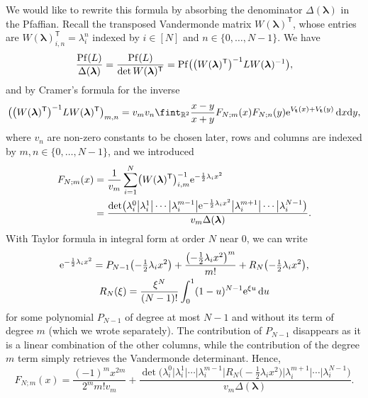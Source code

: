 \documentclass[10pt,a4paper]{amsart}
\numberwithin{equation}{section}
\newcommand{\dd}{\mathrm{d}}
\begin{document}
We would like to rewrite this formula by absorbing the denominator $\Delta(\boldsymbol{\lambda})$ in the Pfaffian. Recall the transposed Vandermonde matrix $W(\boldsymbol{\lambda})^{\mathsf T}$, whose entries are $W(\boldsymbol{\lambda})_{i,n}^{\mathsf T} = \lambda_i^{n}$ indexed by $i \in [N]$ and $n \in \{0,\dots,N - 1\}$. We have
\[
\frac{{\rm Pf}(L)}{\Delta(\boldsymbol{\lambda})} = \frac{{\rm Pf}(L)}{\det W(\boldsymbol{\lambda})^{\mathsf T}} = {\rm Pf}\bigl(\bigl(W(\boldsymbol{\lambda})^{\mathsf T}\bigr)^{-1} LW(\boldsymbol{\lambda})^{-1}\bigr),
\]
and by Cramer's formula for the inverse
\[
\bigl(\bigl(W(\boldsymbol{\lambda})^{\mathsf T}\bigr)^{-1} L W(\boldsymbol{\lambda})^{\mathsf T}\bigr)_{m,n} = v_mv_n\fint_{\mathbb{R}^2} \frac{x - y}{x + y} F_{N;m}(x)F_{N;n}(y) {\rm e}^{V_{\mathbf{t}}(x) + V_{\mathbf{t}}(y)}\,\dd x\dd y,
\]
where $v_n$ are non-zero constants to be chosen later, rows and columns are indexed by $m,n \in \{0,\dots,N - 1\}$, and we introduced
\begin{align*}
F_{N;m}(x) &{}= \frac{1}{v_m}\sum_{i = 1}^{N} \bigl(W(\boldsymbol{\lambda})^{\mathsf T}\bigr)^{-1}_{i,m} {\rm e}^{-\frac{1}{2}\lambda_i x^2} \\
&{}= \frac{\det\bigl(\lambda_i^0 \big| \lambda_i^1  \big| \cdots \big| \lambda_i^{m - 1} \big| {\rm e}^{-\frac{1}{2}\lambda_i x^2} \big| \lambda_i^{m + 1} \big| \cdots \big| \lambda_i^{N - 1}\bigr)}{v_m \Delta(\boldsymbol{\lambda})}.
\end{align*}
With Taylor formula in integral form at order $N$ near $0$, we can write
\begin{gather*}
{\rm e}^{-\frac{1}{2}\lambda_ix^2} = P_{N - 1}\bigl(-\tfrac{1}{2}\lambda_ix^2\bigr) + \frac{\bigl(-\frac{1}{2}\lambda_i x^2\bigr)^m}{m!} + R_{N}\bigl(-\tfrac{1}{2}\lambda_i x^2\bigr), \\
R_N(\xi) = \frac{\xi^{N}}{(N - 1)!} \int_{0}^{1}(1-u)^{N - 1} {\rm e}^{\xi u}\, \dd u
\end{gather*}
for some polynomial $P_{N - 1}$ of degree at most $N - 1$ and without its term of degree $m$ (which we wrote separately). The contribution of $P_{N - 1}$ disappears as it is a linear combination of the other columns, while the contribution of the degree $m$ term simply retrieves the Vandermonde determinant. Hence,
\[
F_{N;m}(x) = \frac{(-1)^mx^{2m}}{2^m m! v_m} + \frac{\det\bigl(\lambda_i^0  \big| \lambda_i^1  \big| \cdots \big| \lambda_i^{m - 1} \big| R_N\bigl(-\tfrac{1}{2}\lambda_ix^2\bigr) \big| \lambda_i^{m + 1} \big| \cdots \big| \lambda_i^{N - 1}\bigr)}{v_m \Delta(\boldsymbol{\lambda})}.
\]
\end{document}
